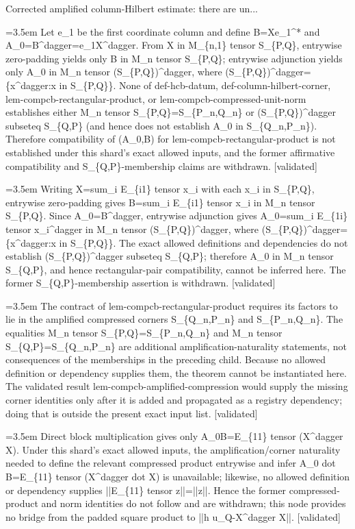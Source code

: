 \documentclass{article}
\newcommand{\step}[1]{\par\noindent\hangindent=3.5em\hangafter=1%
  \makebox[3.5em][l]{\textbf{#1.}}}
\newcommand{\steptag}[1]{\hfill{\small\textsf{[#1]}}}
\begin{document}
\begin{proofbox}{Corrected amplified column-Hilbert estimate: there are un...}
\step{1.3.2.1} Let e\_1 be the first coordinate column and define B=Xe\_1\textasciicircum{}* and A\_0=B\textasciicircum{}dagger=e\_1X\textasciicircum{}dagger. From X in M\_\{n,1\} tensor S\_\{P,Q\}, entrywise zero-padding yields only B in M\_n tensor S\_\{P,Q\}; entrywise adjunction yields only A\_0 in M\_n tensor (S\_\{P,Q\})\textasciicircum{}dagger, where (S\_\{P,Q\})\textasciicircum{}dagger=\{x\textasciicircum{}dagger:x in S\_\{P,Q\}\}. None of def-hcb-datum, def-column-hilbert-corner, lem-compcb-rectangular-product, or lem-compcb-compressed-unit-norm establishes either M\_n tensor S\_\{P,Q\}=S\_\{P\_n,Q\_n\} or (S\_\{P,Q\})\textasciicircum{}dagger subseteq S\_\{Q,P\} (and hence does not establish A\_0 in S\_\{Q\_n,P\_n\}). Therefore compatibility of (A\_0,B) for lem-compcb-rectangular-product is not established under this shard's exact allowed inputs, and the former affirmative compatibility and S\_\{Q,P\}-membership claims are withdrawn. \steptag{validated} \\[6pt]
\step{1.3.2.1.1} Writing X=sum\_i E\_\{i1\} tensor x\_i with each x\_i in S\_\{P,Q\}, entrywise zero-padding gives B=sum\_i E\_\{i1\} tensor x\_i in M\_n tensor S\_\{P,Q\}. Since A\_0=B\textasciicircum{}dagger, entrywise adjunction gives A\_0=sum\_i E\_\{1i\} tensor x\_i\textasciicircum{}dagger in M\_n tensor (S\_\{P,Q\})\textasciicircum{}dagger, where (S\_\{P,Q\})\textasciicircum{}dagger=\{x\textasciicircum{}dagger:x in S\_\{P,Q\}\}. The exact allowed definitions and dependencies do not establish (S\_\{P,Q\})\textasciicircum{}dagger subseteq S\_\{Q,P\}; therefore A\_0 in M\_n tensor S\_\{Q,P\}, and hence rectangular-pair compatibility, cannot be inferred here. The former S\_\{Q,P\}-membership assertion is withdrawn. \steptag{validated} \\[4pt]
\step{1.3.2.1.2} The contract of lem-compcb-rectangular-product requires its factors to lie in the amplified compressed corners S\_\{Q\_n,P\_n\} and S\_\{P\_n,Q\_n\}. The equalities M\_n tensor S\_\{P,Q\}=S\_\{P\_n,Q\_n\} and M\_n tensor S\_\{Q,P\}=S\_\{Q\_n,P\_n\} are additional amplification-naturality statements, not consequences of the memberships in the preceding child. Because no allowed definition or dependency supplies them, the theorem cannot be instantiated here. The validated result lem-compcb-amplified-compression would supply the missing corner identities only after it is added and propagated as a registry dependency; doing that is outside the present exact input list. \steptag{validated} \\[4pt]
\step{1.3.2.2} Direct block multiplication gives only A\_0B=E\_\{11\} tensor (X\textasciicircum{}dagger X). Under this shard's exact allowed inputs, the amplification/corner naturality needed to define the relevant compressed product entrywise and infer A\_0 dot B=E\_\{11\} tensor (X\textasciicircum{}dagger dot X) is unavailable; likewise, no allowed definition or dependency supplies ||E\_\{11\} tensor z||=||z||. Hence the former compressed-product and norm identities do not follow and are withdrawn; this node provides no bridge from the padded square product to ||h u\_Q-X\textasciicircum{}dagger X||. \steptag{validated} \\[6pt]

\end{proofbox}
\end{document}
